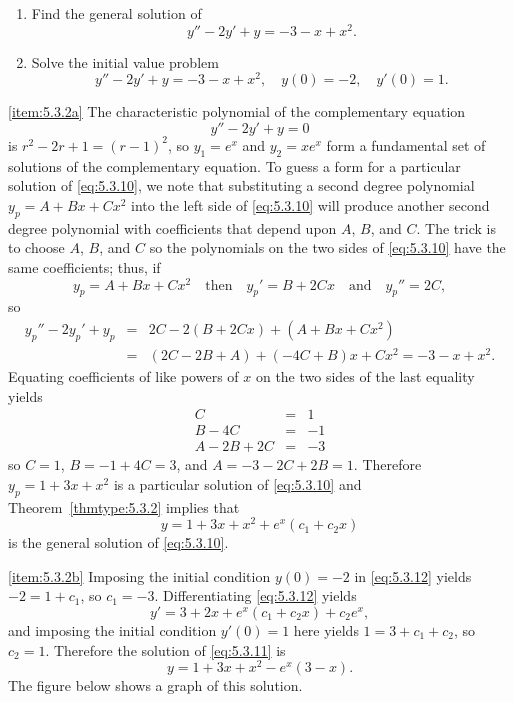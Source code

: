 \documentclass{ximera}
\begin{document}
 
 
\begin{example}\label{example:5.3.2}
\begin{enumerate}
\item \label{item:5.3.2a} %
Find the general solution of
\begin{equation} \label{eq:5.3.10}
y''-2y'+y=-3-x+x^2.
\end{equation}
\item \label{item:5.3.2b} %
Solve the initial value problem
\begin{equation} \label{eq:5.3.11}
y''-2y'+y=-3-x+x^2, \quad  y(0)=-2,\quad y'(0)=1.
\end{equation}
\end{enumerate}
 
\begin{explanation}
\ref{item:5.3.2a} The characteristic polynomial of the complementary equation
$$
y''-2y'+y=0
$$
is $r^2-2r+1=(r-1)^2$,
so $y_1=e^x$ and $y_2=xe^x$  form a fundamental set of solutions
of the complementary equation. To guess  a form for a particular
solution of \eqref{eq:5.3.10}, we note that substituting a second
degree polynomial $y_p=A+Bx+Cx^2$ into the left side of \eqref{eq:5.3.10}
will produce another second degree polynomial with coefficients that
depend upon $A$, $B$, and $C$. The trick is to choose $A$, $B$, and
$C$ so the polynomials on the two sides of \eqref{eq:5.3.10} have the
same coefficients;   thus,
if
$$
y_p=A+Bx+Cx^2\quad\mbox{then}\quad
y_p'=B+2Cx\quad\mbox{and}\quad y_p''=2C,
$$
so
\begin{eqnarray*}
y_p''-2y_p'+y_p&=&2C-2(B+2Cx)+(A+Bx+Cx^2)\\
&=&(2C-2B+A)+(-4C+B)x+Cx^2=-3-x+x^2.
\end{eqnarray*}
Equating  coefficients of like powers of $x$ on the two sides of the
last equality yields
\begin{eqnarray*}
C&=&1\\
B-4C&=&-1\\
A-2B+2C&=& -3
\end{eqnarray*}
so $C=1$, $B=-1+4C=3$, and $A=-3-2C+2B=1$.
Therefore $y_p=1+3x+x^2$ is a particular solution of
\eqref{eq:5.3.10} and  Theorem~\ref{thmtype:5.3.2} implies that
\begin{equation} \label{eq:5.3.12}
y=1+3x+x^2+e^x(c_1+c_2x)
\end{equation}
is the general solution of \eqref{eq:5.3.10}.
 
\ref{item:5.3.2b} Imposing the initial condition $y(0)=-2$ in
\eqref{eq:5.3.12} yields $-2=1+c_1$, so $c_1=-3$. Differentiating
\eqref{eq:5.3.12} yields
$$
y'=3+2x+e^x(c_1+c_2x)+c_2e^x,
$$
and imposing the initial condition $y'(0)=1$ here yields
$1=3+c_1+c_2$, so $c_2=1$. Therefore the solution of \eqref{eq:5.3.11}
is
$$
y=1+3x+x^2-e^x(3-x).
$$
The figure below shows a graph of this solution.


\end{explanation}
\end{example}
\end{document}
